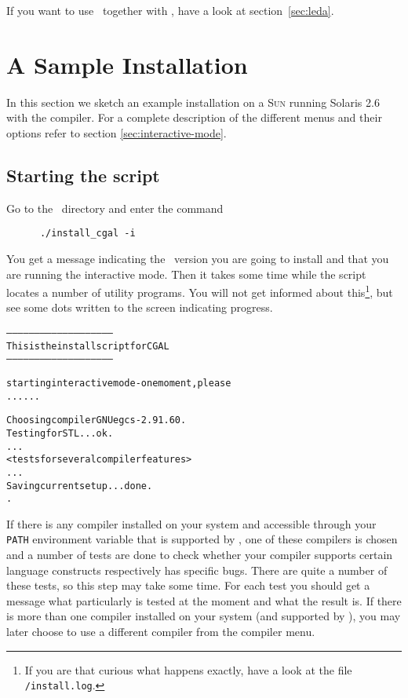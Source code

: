 If you want to use \leda\ together with \cgal, have a look at
section~\ref{sec:leda}.

\section{A Sample Installation}\label{sec:sample-inst}

In this section we sketch an example installation on a \textsc{Sun}
running Solaris 2.6 with the  compiler. For a complete
description of the different menus and their options refer to section
\ref{sec:interactive-mode}.

\subsection{Starting the script}

Go to the \cgaldir\ directory and enter the command
\begin{verbatim}
      ./install_cgal -i
\end{verbatim}

You get a message indicating the \cgal\ version you are going to
install and that you are running the interactive mode. Then it takes
some time while the script locates a number of utility programs. You
will not get informed about this\footnote{If you are that curious what
  happens exactly, have a look at the file
  \texttt{\cgaldir/install.log}.}, but see some dots written to the
screen indicating progress.

{\ccTexHtml{\scriptsize}{}
\begin{alltt}
--------------------------------------------------------
  This is the install script for CGAL \cgalrelease
--------------------------------------------------------

starting interactive mode - one moment, please
......

  Choosing compiler GNU egcs-2.91.60.
  Testing for STL ... ok.
  ...
  <tests for several compiler features>
  ...
  Saving current setup ... done.
.
\end{alltt}}
  
If there is any compiler installed on your system and accessible
through your \texttt{PATH} environment variable that is supported by
\cgal, one of these compilers is chosen and a number of tests are done
to check whether your compiler supports certain language constructs
respectively has specific bugs. There are quite a number of these
tests, so this step may take some time. For each test you should get a
message what particularly is tested at the moment and what the result
is. If there is more than one compiler installed on your system (and
supported by \cgal), you may later choose to use a different compiler
from the compiler menu.

